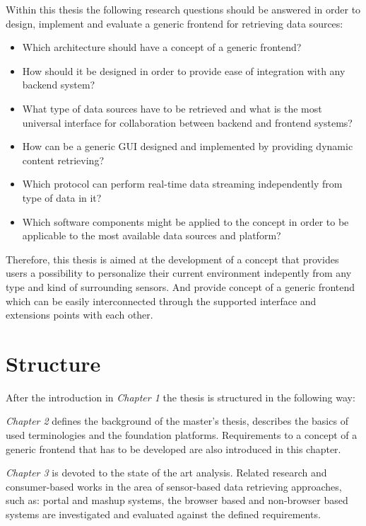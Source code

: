        Within this thesis the following research questions should be answered in order to design, implement and evaluate a generic frontend for retrieving data sources: 
       \begin{itemize}
       \item Which architecture should have a concept of a generic frontend?
       \item How should it be designed in order to provide ease of integration with any backend system?
       \item What type of data sources have to be retrieved and what is the most universal interface for collaboration between backend and frontend systems?
       \item How can be a generic GUI designed and implemented by providing dynamic content retrieving?
       \item Which protocol can perform real-time data streaming independently from type of data in it?
       \item Which software components might be applied to the concept in order to be applicable to the most available data sources and platform?
       \end{itemize}

     Therefore, this thesis is aimed at the development of a concept that provides users a possibility to personalize their current environment indepently from any type and kind of surrounding sensors. And provide concept of a generic frontend which can be easily interconnected through the supported interface and extensions points with each other.

\section{Structure}

After the introduction in \emph{Chapter 1} the thesis is structured in the following way:

\emph{Chapter 2} defines the background of the master's thesis, describes the basics of used terminologies and the foundation platforms. Requirements to a concept of a generic frontend that has to be developed are also introduced in this chapter.

\emph{Chapter 3} is devoted to the state of the art analysis. Related research and consumer-based works in the area of sensor-based data retrieving approaches, such as: portal and mashup systems, the browser based and non-browser based systems are investigated and evaluated against the defined requirements.


